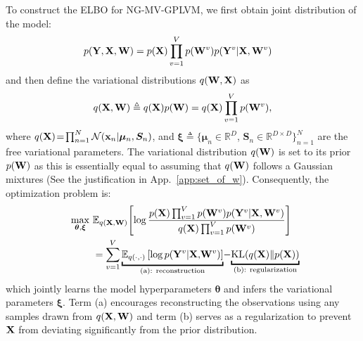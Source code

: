 To construct the \MakeUppercase{elbo} for \MakeUppercase{ng-mv-gplvm}, we first obtain joint distribution of the model: 
\begin{equation}
\setlength{\abovedisplayskip}{3pt}
\setlength{\belowdisplayskip}{2pt}
    \begin{aligned}
        p(\vy, \vx, \vw) &= p(\vx) \prod_{v=1}^{V} p(\vw^v) p(\vy^v \vert \vx, \vw^v)
    \end{aligned}
    \label{eq:model_joint}
\end{equation}
and then define the variational distributions $q({\mathbf W}, {\mathbf X})$ as
\begin{equation}
\setlength{\abovedisplayskip}{3pt}
\setlength{\belowdisplayskip}{2pt}
    q(\vx, \vw) \triangleq q(\vx) p(\vw) = q(\vx) \prod_{v=1}^{V} p(\vw^v), 
    \label{eq:variational_dis}
\end{equation}
where $q({\mathbf X})\!=\!\prod_{n=1}^N \mathcal{N}({\mathbf x}_n \vert \boldsymbol{\mu}_n,\boldsymbol{S}_n)$, and $\bm \xi\!\triangleq\!\{ \bm{\mu}_n\!\in\!\mathbb{R}^D$, $\bm{S}_n\!\in\!\mathbb{R}^{D \times D} \}_{n=1}^{N}$ are the free variational parameters. The variational distribution $q({\mathbf W})$ is set to its prior $p({\mathbf W})$ as this is essentially equal to assuming that $q({\mathbf W})$ follows a Gaussian mixtures (See the justification in App.~\ref{app:set_of_w}). Consequently, the optimization problem is:
\begin{equation}
\begin{aligned}
\setlength{\abovedisplayskip}{4pt}
\setlength{\belowdisplayskip}{3pt}
    \nonumber
    \max_{\bm \theta, \bm \xi} \ & \mathbb{E}_{q(\vx, \vw)} \! \left[\log \frac{p(\vx) \prod_{v=1}^{V} p(\vw^v) p(\vy^v \vert \vx, \vw^v)}{q(\vx)\prod_{v=1}^{V} p(\vw^v)} \right] \\  
    & = \sum_{v=1}^V \underbracket{\mathbb{E}_{q(\cdot, \cdot)} \left[ \log p(\vy^v \vert \vx,\!\vw^v) \right]}_{\text{(a): reconstruction}}\!-\!\underbracket{ \operatorname{KL}(q(\vx) \| p(\vx))}_{\text{(b): regularization}}\!\!\! 
\end{aligned}
\end{equation}
which jointly learns the model hyperparameters $\bm \theta$ and infers the variational parameters $\bm \xi$. Term (a) encourages reconstructing the observations using any samples drawn from \(q({\mathbf X}, {\mathbf W})\) and term (b) serves as a regularization to prevent \({\mathbf X}\) from deviating significantly from the prior distribution. 

